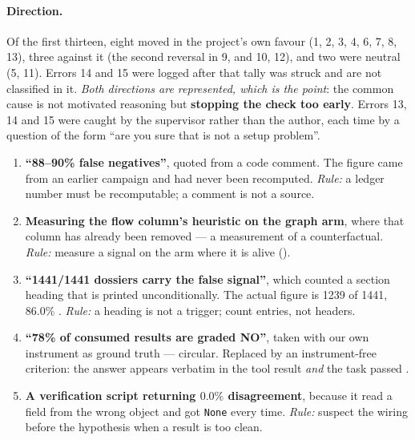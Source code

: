 \paragraph{Direction.} Of the first thirteen, eight moved in the
project's own favour (1, 2, 3, 4, 6, 7, 8, 13), three against it (the
second reversal in 9, and 10, 12), and two were neutral (5, 11). Errors 14
and 15 were logged after that tally was struck and are not classified in
it. \emph{Both directions are represented, which is the point}: the common
cause is not motivated reasoning but \textbf{stopping the check too early}.
Errors 13, 14 and 15 were caught by the supervisor rather than the author,
each time by a question of the form ``are you sure that is not a setup
problem''.

\begin{enumerate}[leftmargin=2.2em]

  \item \textbf{``88--90\% false negatives''}, quoted from a code comment.
        The figure came from an earlier campaign and had never been
        recomputed. \emph{Rule:} a ledger number must be recomputable; a
        comment is not a source.

  \item \textbf{Measuring the flow column's heuristic on the graph arm},
        where that column has already been removed --- a measurement of a
        counterfactual. \emph{Rule:} measure a signal on the arm where it
        is alive ().

  \item \textbf{``1441/1441 dossiers carry the false signal''}, which
        counted a section heading that is printed unconditionally. The
        actual figure is 1239 of 1441, $86.0\%$ . \emph{Rule:} a
        heading is not a trigger; count entries, not headers.

  \item \textbf{``78\% of consumed results are graded NO''}, taken with our
        own instrument as ground truth --- circular. Replaced by an
        instrument-free criterion: the answer appears verbatim in the tool
        result \emph{and} the task passed .

  \item \textbf{A verification script returning $0.0\%$ disagreement},
        because it read a field from the wrong object and got \texttt{None}
        every time. \emph{Rule:} suspect the wiring before the hypothesis
        when a result is too clean.


\end{enumerate}
